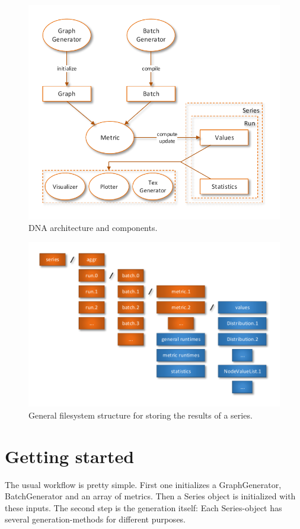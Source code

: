 \begin{figure} [h]
\centering
\includegraphics [scale=1.2] {images/dna-architecture}
\caption{DNA architecture and components.}
\label{fig:dna-architecture}
\end{figure}

\begin{figure} [h]
\centering
\includegraphics [scale=1] {images/fs-struct-gen}
\caption{General filesystem structure for storing the results of a series.}
\label{fig:fs-struct-gen}
\end{figure}


\section{Getting started}
The usual workflow is pretty simple. First one initializes a GraphGenerator, BatchGenerator and an array of metrics. Then a Series object is initialized with these inputs. The second step is the generation itself: Each Series-object has several generation-methods for different purposes. 

